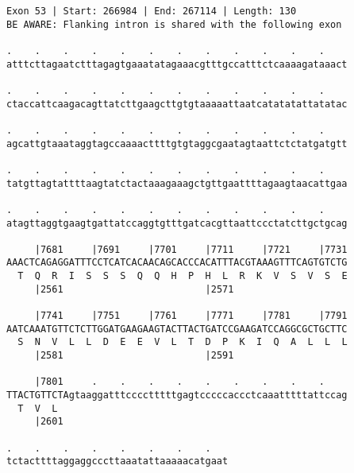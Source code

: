 \documentclass{article}
\begin{document}
\begin{Verbatim}[fontfamily=courier]
Exon 53 | Start: 266984 | End: 267114 | Length: 130
BE AWARE: Flanking intron is shared with the following exon

.    .    .    .    .    .    .    .    .    .    .    .    
atttcttagaatctttagagtgaaatatagaaacgtttgccatttctcaaaagataaact

.    .    .    .    .    .    .    .    .    .    .    .    
ctaccattcaagacagttatcttgaagcttgtgtaaaaattaatcatatatattatatac

.    .    .    .    .    .    .    .    .    .    .    .    
agcattgtaaataggtagccaaaacttttgtgtaggcgaatagtaattctctatgatgtt

.    .    .    .    .    .    .    .    .    .    .    .    
tatgttagtattttaagtatctactaaagaaagctgttgaattttagaagtaacattgaa

.    .    .    .    .    .    .    .    .    .    .    .    
atagttaggtgaagtgattatccaggtgtttgatcacgttaattccctatcttgctgcag

     |7681     |7691     |7701     |7711     |7721     |7731
AAACTCAGAGGATTTCCTCATCACAACAGCACCCACATTTACGTAAAGTTTCAGTGTCTG
  T  Q  R  I  S  S  S  Q  Q  H  P  H  L  R  K  V  S  V  S  E
     |2561                         |2571                    

     |7741     |7751     |7761     |7771     |7781     |7791
AATCAAATGTTCTCTTGGATGAAGAAGTACTTACTGATCCGAAGATCCAGGCGCTGCTTC
  S  N  V  L  L  D  E  E  V  L  T  D  P  K  I  Q  A  L  L  L
     |2581                         |2591                    

     |7801     .    .    .    .    .    .    .    .    .    
TTACTGTTCTAgtaaggatttcccctttttgagtcccccaccctcaaatttttattccag
  T  V  L                                                   
     |2601                                                  

.    .    .    .    .    .    .    .   
tctacttttaggaggcccttaaatattaaaaacatgaat
\end{Verbatim}
\newpage
\end{document}
